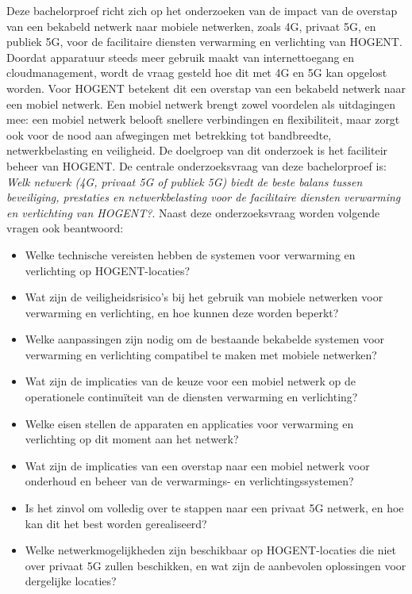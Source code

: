 Deze bachelorproef richt zich op het onderzoeken van de impact van de overstap van een bekabeld netwerk naar mobiele netwerken, zoals 4G, privaat 5G, en publiek 5G, voor de facilitaire diensten verwarming en verlichting van HOGENT. Doordat apparatuur steeds meer gebruik maakt van internettoegang en cloudmanagement, wordt de vraag gesteld hoe dit met 4G en 5G kan opgelost worden. Voor HOGENT betekent dit een overstap van een bekabeld netwerk naar een mobiel netwerk. Een mobiel netwerk brengt zowel voordelen als uitdagingen mee: een mobiel netwerk belooft snellere verbindingen en flexibiliteit, maar zorgt ook voor de nood aan afwegingen met betrekking tot bandbreedte, netwerkbelasting en veiligheid. De doelgroep van dit onderzoek is het faciliteir beheer van HOGENT. De centrale onderzoeksvraag van deze bachelorproef is: \textit{Welk netwerk (4G, privaat 5G of publiek 5G) biedt de beste balans tussen beveiliging, prestaties en netwerkbelasting voor de facilitaire diensten verwarming en verlichting van HOGENT?}. Naast deze onderzoeksvraag worden volgende vragen ook beantwoord: 
\begin{itemize}
    \item Welke technische vereisten hebben de systemen voor verwarming en verlichting op HOGENT-locaties?
    \item Wat zijn de veiligheidsrisico’s bij het gebruik van mobiele netwerken voor verwarming en verlichting, en hoe kunnen deze worden beperkt?
    \item Welke aanpassingen zijn nodig om de bestaande bekabelde systemen voor verwarming en verlichting compatibel te maken met mobiele netwerken?
    \item Wat zijn de implicaties van de keuze voor een mobiel netwerk op de operationele continuïteit van de diensten verwarming en verlichting?
    \item Welke eisen stellen de apparaten en applicaties voor verwarming en verlichting op dit moment aan het netwerk?
    \item Wat zijn de implicaties van een overstap naar een mobiel netwerk voor onderhoud en beheer van de verwarmings- en verlichtingssystemen?
    \item Is het zinvol om volledig over te stappen naar een privaat 5G netwerk, en hoe kan dit het best worden gerealiseerd?
    \item Welke netwerkmogelijkheden zijn beschikbaar op HOGENT-locaties die niet over privaat 5G zullen beschikken, en wat zijn de aanbevolen oplossingen voor dergelijke locaties?
\end{itemize}

